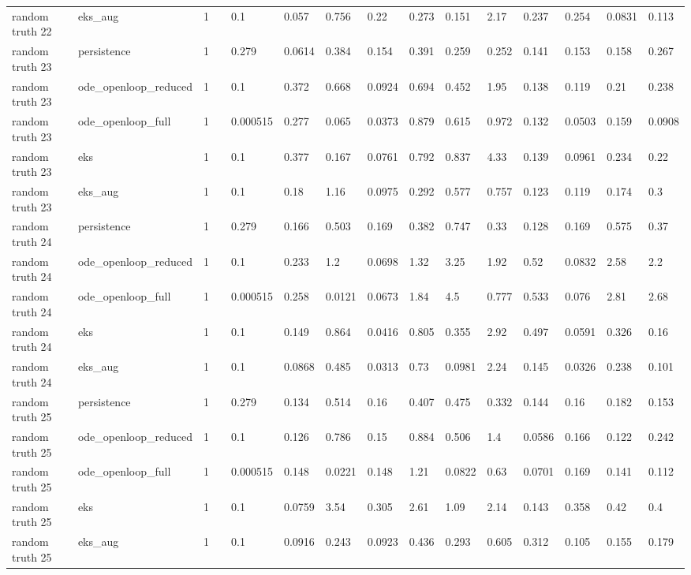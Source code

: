 \begin{table}[t]
\begin{tabular}{lllllllllllllll}
random truth 22 & eks\_aug & 1 &  & 0.1 & 0.057 & 0.756 & 0.22 & 0.273 & 0.151 & 2.17 & 0.237 & 0.254 & 0.0831 & 0.113 \\
random truth 23 & persistence & 1 &  & 0.279 & 0.0614 & 0.384 & 0.154 & 0.391 & 0.259 & 0.252 & 0.141 & 0.153 & 0.158 & 0.267 \\
random truth 23 & ode\_openloop\_reduced & 1 &  & 0.1 & 0.372 & 0.668 & 0.0924 & 0.694 & 0.452 & 1.95 & 0.138 & 0.119 & 0.21 & 0.238 \\
random truth 23 & ode\_openloop\_full & 1 &  & 0.000515 & 0.277 & 0.065 & 0.0373 & 0.879 & 0.615 & 0.972 & 0.132 & 0.0503 & 0.159 & 0.0908 \\
random truth 23 & eks & 1 &  & 0.1 & 0.377 & 0.167 & 0.0761 & 0.792 & 0.837 & 4.33 & 0.139 & 0.0961 & 0.234 & 0.22 \\
random truth 23 & eks\_aug & 1 &  & 0.1 & 0.18 & 1.16 & 0.0975 & 0.292 & 0.577 & 0.757 & 0.123 & 0.119 & 0.174 & 0.3 \\
random truth 24 & persistence & 1 &  & 0.279 & 0.166 & 0.503 & 0.169 & 0.382 & 0.747 & 0.33 & 0.128 & 0.169 & 0.575 & 0.37 \\
random truth 24 & ode\_openloop\_reduced & 1 &  & 0.1 & 0.233 & 1.2 & 0.0698 & 1.32 & 3.25 & 1.92 & 0.52 & 0.0832 & 2.58 & 2.2 \\
random truth 24 & ode\_openloop\_full & 1 &  & 0.000515 & 0.258 & 0.0121 & 0.0673 & 1.84 & 4.5 & 0.777 & 0.533 & 0.076 & 2.81 & 2.68 \\
random truth 24 & eks & 1 &  & 0.1 & 0.149 & 0.864 & 0.0416 & 0.805 & 0.355 & 2.92 & 0.497 & 0.0591 & 0.326 & 0.16 \\
random truth 24 & eks\_aug & 1 &  & 0.1 & 0.0868 & 0.485 & 0.0313 & 0.73 & 0.0981 & 2.24 & 0.145 & 0.0326 & 0.238 & 0.101 \\
random truth 25 & persistence & 1 &  & 0.279 & 0.134 & 0.514 & 0.16 & 0.407 & 0.475 & 0.332 & 0.144 & 0.16 & 0.182 & 0.153 \\
random truth 25 & ode\_openloop\_reduced & 1 &  & 0.1 & 0.126 & 0.786 & 0.15 & 0.884 & 0.506 & 1.4 & 0.0586 & 0.166 & 0.122 & 0.242 \\
random truth 25 & ode\_openloop\_full & 1 &  & 0.000515 & 0.148 & 0.0221 & 0.148 & 1.21 & 0.0822 & 0.63 & 0.0701 & 0.169 & 0.141 & 0.112 \\
random truth 25 & eks & 1 &  & 0.1 & 0.0759 & 3.54 & 0.305 & 2.61 & 1.09 & 2.14 & 0.143 & 0.358 & 0.42 & 0.4 \\
random truth 25 & eks\_aug & 1 &  & 0.1 & 0.0916 & 0.243 & 0.0923 & 0.436 & 0.293 & 0.605 & 0.312 & 0.105 & 0.155 & 0.179 \\

\end{tabular}
\end{table}
